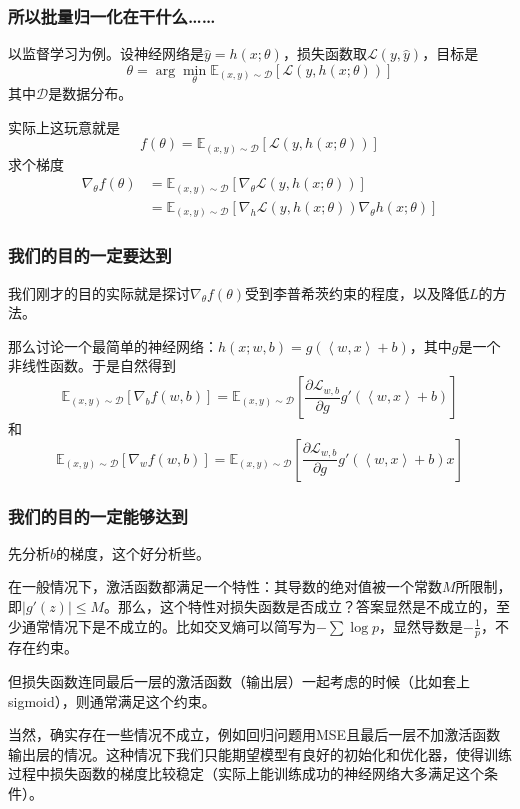\documentclass{ctexbeamer}
\begin{document}
\begin{frame}
    \frametitle{所以批量归一化在干什么……}

    以监督学习为例。设神经网络是$\hat{y} = h(x;\theta)$，损失函数取$\mathcal{L}(y,\hat{y})$，目标是
    \begin{equation}
        \theta = \arg\min_\theta \mathbb{E}_{(x,y) \sim \mathcal{D}} \left[\mathcal{L}(y, h(x;\theta))\right]
    \end{equation}
    其中$\mathcal{D}$是数据分布。

    实际上这玩意就是
    \begin{equation}
        f(\theta) = \mathbb{E}_{(x,y) \sim \mathcal{D}} \left[\mathcal{L}(y, h(x;\theta))\right]
    \end{equation}
    求个梯度
    \begin{align}
        \nabla_\theta f(\theta) &= \mathbb{E}_{(x,y) \sim \mathcal{D}} \left[\nabla_\theta \mathcal{L}(y, h(x;\theta))\right] \\
        &= \mathbb{E}_{(x,y) \sim \mathcal{D}} \left[\nabla_h \mathcal{L}(y, h(x;\theta))\nabla_\theta h(x ; \theta)\right]
    \end{align}
\end{frame}

\begin{frame}
    \frametitle{我们的目的一定要达到}

    我们刚才的目的实际就是探讨$\nabla_\theta f(\theta)$受到李普希茨约束的程度，以及降低$L$的方法。

    那么讨论一个最简单的神经网络：$h(x; w, b) = g(\left\langle w, x \right\rangle + b)$，其中$g$是一个非线性函数。于是自然得到
\begin{equation}
\mathbb{E}_{(x,y) \sim \mathcal{D}}[\nabla_b f(w, b)] = \mathbb{E}_{(x,y) \sim \mathcal{D}}\left[\frac{\partial \mathcal{L}_{w, b}}{\partial g}g'(\left\langle w, x \right\rangle + b)\right]
\end{equation}
和
\begin{equation}
\mathbb{E}_{(x,y) \sim \mathcal{D}}[\nabla_w f(w, b)] = \mathbb{E}_{(x,y) \sim \mathcal{D}}\left[\frac{\partial \mathcal{L}_{w, b}}{\partial g}g'(\left\langle w, x \right\rangle + b) x\right]
\end{equation}
\end{frame}

\begin{frame}
    \frametitle{我们的目的一定能够达到}

    先分析$b$的梯度，这个好分析些。

    在一般情况下，激活函数都满足一个特性：其导数的绝对值被一个常数$M$所限制，即$|g'(z)| \leq M$。那么，这个特性对损失函数是否成立？答案显然是不成立的，至少通常情况下是不成立的。比如交叉熵可以简写为$-\sum\log p$，显然导数是$-\frac{1}{p}$，不存在约束。

    但损失函数连同最后一层的激活函数（输出层）一起考虑的时候（比如套上sigmoid），则通常满足这个约束。

    当然，确实存在一些情况不成立，例如回归问题用MSE且最后一层不加激活函数输出层的情况。这种情况下我们只能期望模型有良好的初始化和优化器，使得训练过程中损失函数的梯度比较稳定（实际上能训练成功的神经网络大多满足这个条件）。

\end{frame}
\end{document}
